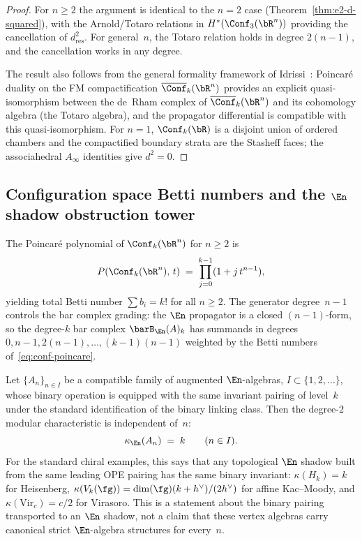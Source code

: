 \begin{proof}
For $n \geq 2$ the argument is identical to the $n = 2$ case
(Theorem~\ref{thm:e2-d-squared}), with the Arnold/Totaro
relations in $H^*(\Conf_3(\bR^n))$ providing the cancellation of
$d_{\mathrm{res}}^2$. For general~$n$, the Totaro relation holds
in degree $2(n-1)$, and the cancellation works in any degree.

The result also follows from the general formality framework of
Idrissi~\cite{Idrissi22}: Poincar\'e duality on the FM
compactification $\overline{\Conf}_k(\bR^n)$ provides an explicit
quasi-isomorphism between the de~Rham complex of
$\overline{\Conf}_k(\bR^n)$ and its cohomology algebra (the Totaro
algebra), and the propagator differential is compatible with this
quasi-isomorphism.
For $n=1$, $\Conf_k(\bR)$ is a disjoint union of ordered chambers and
the compactified boundary strata are the Stasheff faces; the
associahedral $A_\infty$ identities give $d^2=0$.
\end{proof}

\subsection{Configuration space Betti numbers and the $\En$ shadow obstruction tower}
\label{subsec:en-shadow-tower}

The Poincar\'e polynomial of $\Conf_k(\bR^n)$ for $n \geq 2$ is
\begin{equation}\label{eq:conf-poincare}
P(\Conf_k(\bR^n),\, t)
\;=\;
\prod_{j=0}^{k-1} (1 + j\, t^{n-1}),
\end{equation}
yielding total Betti number $\sum b_i = k!$ for all $n \geq 2$. The
generator degree~$n-1$ controls the bar complex grading: the $\En$
propagator is a closed $(n{-}1)$-form, so the degree-$k$ bar complex
$\barB_{\En}(A)_k$ has summands in degrees $0, n{-}1, 2(n{-}1),
\ldots, (k{-}1)(n{-}1)$ weighted by the Betti numbers
of~\eqref{eq:conf-poincare}.

\begin{proposition}
\label{prop:kappa-universality-en}
Let $\{A_n\}_{n\in I}$ be a compatible family of augmented
$\En$-algebras, $I\subset \{1,2,\ldots\}$, whose binary operation is
equipped with the same invariant pairing of level~$k$ under the
standard identification of the binary linking class. Then the
degree-$2$ modular characteristic is independent of~$n$:
\[
\kappa_{\En}(A_n) \;=\; k
\qquad (n\in I).
\]
For the standard chiral examples, this says that any topological
$\En$ shadow built from the same leading OPE pairing has the same
binary invariant:
$\kappa(H_k) = k$ for Heisenberg,
$\kappa(V_k(\fg)) = \dim(\fg)(k + h^\vee)/(2h^\vee)$ for affine
Kac--Moody, and $\kappa(\mathrm{Vir}_c)=c/2$ for Virasoro. This is
a statement about the binary pairing transported to an $\En$ shadow,
not a claim that these vertex algebras carry canonical strict
$\En$-algebra structures for every~$n$.
\end{proposition}

